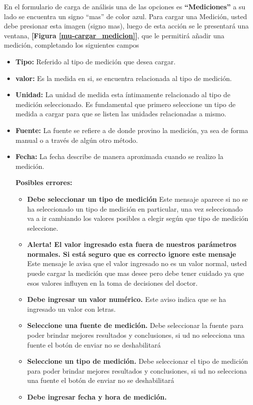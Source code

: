  	En el formulario de carga de análisis una de las opciones es \textbf{``Mediciones''} a su lado se encuentra  un signo ``mas'' de color azul. Para cargar una Medición, usted debe presionar esta imagen (signo mas), luego de esta acción se le presentará una ventana, \textbf{[Figura \ref{mu-cargar_medicion}]}, que le permitirá añadir una medición, completando los siguientes campos
 	\begin{itemize}
 		\item \textbf{Tipo: } Referido al tipo de medición que desea cargar.
 		\item \textbf{valor:} Es la medida en si, se encuentra relacionada al tipo de medición.
 		\item \textbf{Unidad: } La unidad de medida esta íntimamente relacionado al tipo de medición seleccionado. Es fundamental que primero seleccione un tipo de medida a cargar para que se listen las unidades relacionadas a mismo.
 		\item \textbf{Fuente:} La fuente se refiere a de donde provino la medición, ya sea de forma manual o a través de algún otro método.
 		\item \textbf{Fecha:} La fecha describe de manera aproximada cuando se realizo la medición.
 		
 		\textbf{Posibles errores:}
	
 		\begin{itemize}
 				\item \textbf{Debe seleccionar un tipo de medición} Este mensaje aparece si no se ha seleccionado un tipo de medición en particular, una vez seleccionado va a ir cambiando los valores posibles a elegir según que tipo de medición seleccione.
 				\item \textbf{Alerta! El valor ingresado esta fuera de nuestros parámetros normales. Si está seguro que es correcto ignore este mensaje} Este mensaje le avisa que el valor ingresado no es un valor normal, usted puede cargar la medición que mas desee pero debe tener cuidado ya que esos valores influyen en la toma de decisiones del doctor.
 				\item \textbf{Debe ingresar un valor numérico.} Este aviso indica que se ha ingresado un valor con letras.
 				\item \textbf{Seleccione una fuente de medición.} Debe seleccionar la fuente para poder brindar mejores resultados y conclusiones, si ud no selecciona una fuente el botón de enviar no se deshabilitará
 				\item \textbf{Seleccione un tipo de medición.} Debe seleccionar el tipo de medición para poder brindar mejores resultados y conclusiones, si ud no selecciona una fuente el botón de enviar no se deshabilitará
	 			\item \textbf{Debe ingresar fecha y hora de medición. }
 		\end{itemize}
	\end{itemize}
	 
